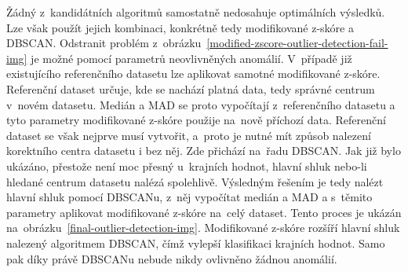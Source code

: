 Žádný z~kandidátních algoritmů samostatně nedosahuje optimálních výsledků. Lze však použít jejich kombinaci, konkrétně tedy modifikované z-skóre a DBSCAN. Odstranit problém z~obrázku~\ref{modified-zscore-outlier-detection-fail-img} je možné pomocí parametrů neovlivněných anomálií. V~případě již existujícího referenčního datasetu lze aplikovat samotné modifikované z-skóre. Referenční dataset určuje, kde se nachází platná data, tedy správné centrum v~novém datasetu. Medián a MAD se proto vypočítají z~referenčního datasetu a tyto parametry modifikované z-skóre použije na~nově příchozí data. Referenční dataset se však nejprve musí vytvořit, a~proto je nutné mít způsob nalezení korektního centra datasetu i bez něj. Zde přichází na~řadu DBSCAN. Jak již bylo ukázáno, přestože není moc přesný u~krajních hodnot, hlavní shluk nebo-li hledané centrum datasetu nalézá spolehlivě. Výsledným řešením je tedy nalézt hlavní shluk pomocí DBSCANu, z~něj vypočítat medián a MAD a s~těmito parametry aplikovat modifikované z-skóre na~celý dataset. Tento proces je ukázán na~obrázku~\ref{final-outlier-detection-img}. Modifikované z-skóre rozšíří hlavní shluk nalezený algoritmem DBSCAN, čímž vylepší klasifikaci krajních hodnot. Samo pak díky právě DBSCANu nebude nikdy ovlivněno žádnou anomálií.

